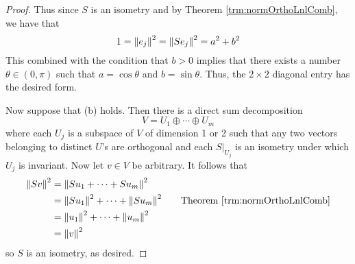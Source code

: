 \documentclass[../main.tex]{subfiles}
\begin{document}
\begin{itemize}
\begin{theorem}
\begin{proof}
            Thus since $S$ is an isometry and by Theorem \ref{trm:normOrthoLnlComb}, we have that
            \begin{equation*}
                1 = \norm{e_j}^2 = \norm{Se_j}^2 = a^2+b^2
            \end{equation*}
            This combined with the condition that $b>0$ implies that there exists a number $\theta\in(0,\pi)$ such that $a=\cos\theta$ and $b=\sin\theta$. Thus, the $2\times 2$ diagonal entry has the desired form.\par\smallskip
            Now suppose that (b) holds. Then there is a direct sum decomposition
            \begin{equation*}
                V = U_1\oplus\cdots\oplus U_m
            \end{equation*}
            where each $U_j$ is a subspace of $V$ of dimension 1 or 2 such that any two vectors belonging to distinct $U$'s are orthogonal and each $S|_{U_j}$ is an isometry under which $U_j$ is invariant. Now let $v\in V$ be arbitrary. It follows that
            \begin{align*}
                \norm{Sv}^2 &= \norm{Su_1+\cdots+Su_m}^2\\
                &= \norm{Su_1}^2+\cdots+\norm{Su_m}^2\tag*{Theorem \ref{trm:normOrthoLnlComb}}\\
                &= \norm{u_1}^2+\cdots+\norm{u_m}^2\\
                &= \norm{v}^2
            \end{align*}
            so $S$ is an isometry, as desired.
        \end{proof}
    \end{theorem}
\end{itemize}
\end{document}
